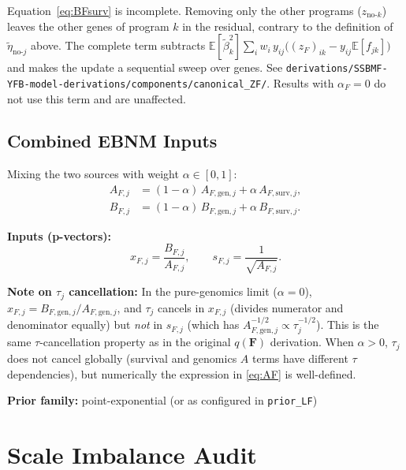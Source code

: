 \documentclass[11pt]{article}
\newcommand{\E}{\mathbb{E}}
\begin{document}
\begin{correctionbox}[Correction (2026-10-15)]
Equation~\eqref{eq:BFsurv} is incomplete. Removing only the other programs ($z_{\text{no-}k}$)
leaves the other genes of program $k$ in the residual, contrary to the definition of
$\tilde\eta_{\text{no-}j}$ above. The complete term subtracts
$\E[\tilde\beta_k^2]\sum_i w_i\,y_{ij}\bigl((z_F)_{ik}-y_{ij}\E[f_{jk}]\bigr)$ and makes the update a
sequential sweep over genes. See \texttt{derivations/SSBMF-YFB-model-derivations/components/canonical\_ZF/}. Results with
$\alpha_F = 0$ do not use this term and are unaffected.
\end{correctionbox}

\subsection{Combined EBNM Inputs}

Mixing the two sources with weight $\alpha \in [0,1]$:
\begin{align}
  A_{F,j} &= (1-\alpha)\,A_{F,\text{gen},j} + \alpha\,A_{F,\text{surv},j}, \label{eq:AF}\\
  B_{F,j} &= (1-\alpha)\,B_{F,\text{gen},j} + \alpha\,B_{F,\text{surv},j}. \label{eq:BF}
\end{align}

\begin{ebnmbox}
\textbf{Inputs (p-vectors):}
\[
  x_{F,j} = \frac{B_{F,j}}{A_{F,j}}, \qquad
  s_{F,j} = \frac{1}{\sqrt{A_{F,j}}}.
\]

\textbf{Note on $\tau_j$ cancellation:} In the pure-genomics limit ($\alpha=0$),
$x_{F,j} = B_{F,\text{gen},j}/A_{F,\text{gen},j}$, and $\tau_j$ cancels in $x_{F,j}$
(divides numerator and denominator equally) but \emph{not} in $s_{F,j}$
(which has $A_{F,\text{gen},j}^{-1/2} \propto \tau_j^{-1/2}$). This is the same
$\tau$-cancellation property as in the original $q(\mathbf{F})$ derivation. When $\alpha > 0$,
$\tau_j$ does not cancel globally (survival and genomics $A$ terms have different $\tau$ dependencies),
but numerically the expression in \eqref{eq:AF} is well-defined.

\vspace{6pt}
\textbf{Prior family:} point-exponential (or as configured in \texttt{prior\_LF})
\end{ebnmbox}

\section{Scale Imbalance Audit}
\end{document}
